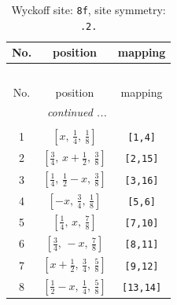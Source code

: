 \documentclass[fleqn,8pt]{jsarticle}
\begin{document}
\begin{longtable}{ccc}
\caption{Wyckoff site: {\tt 8f}, site symmetry: {\tt .2.}}
 \\
 \hline \hline
No. & position & mapping \\ \hline \endfirsthead

\multicolumn{2}{l}{\tablename\ \thetable{}} \\
 \hline \hline
No. & position & mapping \\ \hline \endhead

 \hline \hline
\multicolumn{2}{r}{\footnotesize\it continued ...} \\ \endfoot

 \hline \hline
\multicolumn{2}{r}{} \\ \endlastfoot

1 & $\left[ x,\, \frac{1}{4},\, \frac{1}{8} \right]$ & {\tt [1,4]} \\ \hline
2 & $\left[ \frac{3}{4},\, x + \frac{1}{2},\, \frac{3}{8} \right]$ & {\tt [2,15]} \\ \hline
3 & $\left[ \frac{1}{4},\, \frac{1}{2} - x,\, \frac{3}{8} \right]$ & {\tt [3,16]} \\ \hline
4 & $\left[ - x,\, \frac{3}{4},\, \frac{1}{8} \right]$ & {\tt [5,6]} \\ \hline
5 & $\left[ \frac{1}{4},\, x,\, \frac{7}{8} \right]$ & {\tt [7,10]} \\ \hline
6 & $\left[ \frac{3}{4},\, - x,\, \frac{7}{8} \right]$ & {\tt [8,11]} \\ \hline
7 & $\left[ x + \frac{1}{2},\, \frac{3}{4},\, \frac{5}{8} \right]$ & {\tt [9,12]} \\ \hline
8 & $\left[ \frac{1}{2} - x,\, \frac{1}{4},\, \frac{5}{8} \right]$ & {\tt [13,14]} \\
\end{longtable}
\renewcommand{\arraystretch}{1.2}
\end{document}
